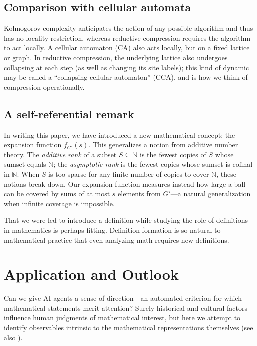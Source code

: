 \documentclass[12pt]{amsart}
\newcommand{\N}{\mathbb{N}}
\theoremstyle{definition}
\theoremstyle{remark}
\begin{document}
\subsection{Comparison with cellular automata}

Kolmogorov complexity anticipates the action of any possible algorithm 
and thus has no locality restriction, whereas reductive compression requires the algorithm to act locally.
A cellular automaton (CA) also acts locally, but on a fixed lattice or graph.
In reductive compression, the underlying lattice also undergoes collapsing at each step (as well as changing its site labels); this kind of dynamic may be called a ``collapsing cellular automaton'' (CCA), and is how we think of compression operationally.

\subsection{A self-referential remark}

In writing this paper, we have introduced a new mathematical concept: the expansion function $f_{G'}(s)$.
This generalizes a notion from additive number theory.
The \emph{additive rank} of a subset $S \subseteq \N$ is the fewest copies of $S$ whose sumset equals $\N$; the \emph{asymptotic rank} is the fewest copies whose sumset is cofinal in $\N$.
When $S$ is too sparse for any finite number of copies to cover $\N$, these notions break down.
Our expansion function measures instead how large a ball can be covered by sums of at most $s$ elements from $G'$---a natural generalization when infinite coverage is impossible.

That we were led to introduce a definition while studying the role of definitions in mathematics is perhaps fitting.
Definition formation is so natural to mathematical practice that even analyzing math requires new definitions.

\section{Application and Outlook}\label{section_application_outlook}

Can we give AI agents a sense of direction—an automated criterion for which mathematical statements merit attention?
Surely historical and cultural factors influence human judgments of mathematical interest, but here we attempt to identify observables intrinsic to the mathematical representations themselves (see also \cite{BDF}). 
\end{document}
